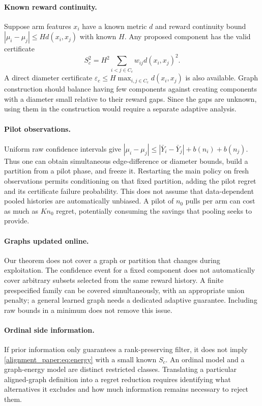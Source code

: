 \paragraph{Known reward continuity.}
Suppose arm features $x_i$ have a known metric $d$ and reward continuity bound
$|\mu_i-\mu_j|\le H d(x_i,x_j)$ with known $H$. Any proposed component has the valid certificate
\begin{equation}
 S_c^2=H^2\sum_{i<j\in C_c}w_{ij}d(x_i,x_j)^2.
\end{equation}
A direct diameter certificate $\varepsilon_c\le H\max_{i,j\in C_c}d(x_i,x_j)$ is also available. Graph construction should balance having few components against creating components with a diameter small relative to their reward gaps. Since the gaps are unknown, using them in the construction would require a separate adaptive analysis.

\paragraph{Pilot observations.}
Uniform raw confidence intervals give
$|\mu_i-\mu_j|\le|\bar Y_i-\bar Y_j|+b(n_i)+b(n_j)$.
Thus one can obtain simultaneous edge-difference or diameter bounds, build a partition from a pilot phase, and freeze it. Restarting the main policy on fresh observations permits conditioning on that fixed partition, adding the pilot regret and its certificate failure probability. This does not assume that data-dependent pooled histories are automatically unbiased. A pilot of $n_0$ pulls per arm can cost as much as $Kn_0$ regret, potentially consuming the savings that pooling seeks to provide.

\paragraph{Graphs updated online.}
Our theorem does not cover a graph or partition that changes during exploitation. The confidence event for a fixed component does not automatically cover arbitrary subsets selected from the same reward history. A finite prespecified family can be covered simultaneously, with an appropriate union penalty; a general learned graph needs a dedicated adaptive guarantee. Including raw bounds in a minimum does not remove this issue.

\paragraph{Ordinal side information.}
If prior information only guarantees a rank-preserving filter, it does not imply \eqref{alignment_paper:eq:energy} with a small known $S_c$. An ordinal model and a graph-energy model are distinct restricted classes. Translating a particular aligned-graph definition into a regret reduction requires identifying what alternatives it excludes and how much information remains necessary to reject them.


